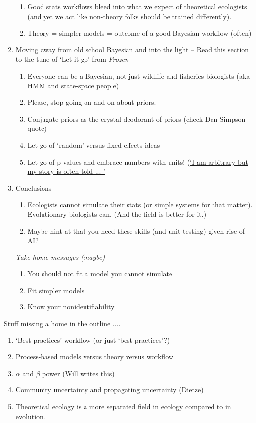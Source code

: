 \documentclass[11pt]{article}
\begin{document}
\begin{enumerate}
\begin{enumerate}
\item Good stats workflows bleed into what we expect of theoretical ecologists (and yet we act like non-theory folks should be trained differently). 
\item Theory = simpler models = outcome of a good Bayesian workflow (often)
\end{enumerate}
\item Moving away from old school Bayesian and into the light -- Read this section to the tune of `Let it go' from \emph{Frozen} 
\begin{enumerate}
\item Everyone can be a Bayesian, not just wildlife and fisheries biologists (aka HMM and state-space people)
\item Please, stop going on and on about priors. 
\item Conjugate priors as the crystal deodorant of priors (check Dan Simpson quote)
\item Let go of `random' versus fixed effects ideas
\item Let go of p-values and embrace numbers with units! (\href{https://www.youtube.com/watch?v=c3hxhv0lpI0}{`I am arbitrary but my story is often told ... '}
\end{enumerate}
\item Conclusions
\begin{enumerate}
\item Ecologists cannot simulate their stats (or simple systems for that matter). Evolutionary biologists can. (And the field is better for it.)
\item Maybe hint at that you need these skills (and unit testing) given rise of AI?
\end{enumerate}
\emph{Take home messages (maybe)}
\begin{enumerate}
\item You should not fit a model you cannot simulate
\item Fit simpler models
\item Know your nonidentifiability
\end{enumerate}
\end{enumerate}
\vspace{2ex}

Stuff missing a home in the outline .... 
\begin{enumerate}
\item `Best practices' workflow (or just `best practices'?)
\item  Process-based models versus theory versus workflow
\item $\alpha$ and $\beta$ power (Will writes this)
\item Community uncertainty and propagating uncertainty (Dietze)
\item Theoretical ecology is a more separated field in ecology compared to in evolution. 
\end{enumerate}
\end{document}
